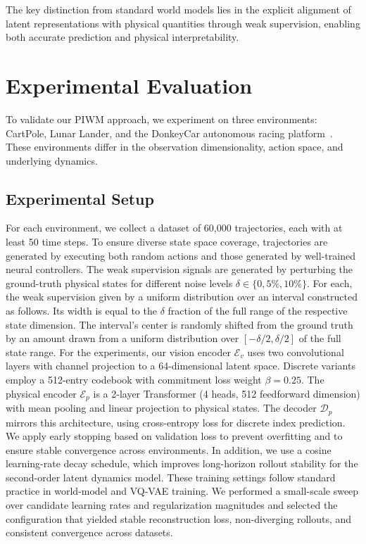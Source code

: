 \documentclass[sigconf]{acmart}
\begin{document}
The key distinction from standard world models lies in the explicit alignment of latent representations with physical quantities through weak supervision, enabling both accurate prediction and physical interpretability.

\section{Experimental Evaluation}\label{sec:results}
To validate our PIWM approach, we experiment on three environments: CartPole, Lunar Lander, and the DonkeyCar autonomous racing platform~\cite[]{brockman2016openai,viitala2021learning}. These environments differ in the observation dimensionality, action space, and underlying dynamics.


\subsection{Experimental Setup}

For each environment, we collect a dataset of 60,000 trajectories, each with at least 50 time steps. To ensure diverse state space coverage, trajectories are generated by executing both random actions and those generated by well-trained neural controllers. The weak supervision signals are generated by perturbing the ground-truth physical states for different noise levels $\delta \in \{0, 5\%, 10\%\}$. For each, the weak supervision given by a uniform distribution over an interval constructed as follows. Its width is equal to the \(\delta\) fraction of the full range of the respective state dimension. The interval's center is randomly shifted from the ground truth by an amount drawn from a uniform distribution over \([-\delta/2, \delta/2]\) of the full state range.
For the experiments, our vision encoder $\mathcal{E}_v$ uses two convolutional layers with channel projection to a 64-dimensional latent space. Discrete variants employ a 512-entry codebook with commitment loss weight $\beta = 0.25$. The physical encoder $\mathcal{E}_p$ is a 2-layer Transformer (4 heads, 512 feedforward dimension) with mean pooling and linear projection to physical states. The decoder $\mathcal{D}_p$ mirrors this architecture, using cross-entropy loss for discrete index prediction. 
We apply early stopping based on validation loss to prevent overfitting and to ensure stable convergence across environments. 
In addition, we use a cosine learning-rate decay schedule, which improves long-horizon rollout stability for the second-order latent dynamics model. 
These training settings follow standard practice in world-model and VQ-VAE training. 
We performed a small-scale sweep over candidate learning rates and regularization magnitudes and selected the configuration that yielded stable reconstruction loss, non-diverging rollouts, and consistent convergence across datasets.
\end{document}
